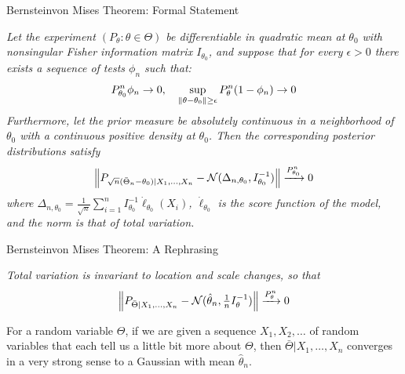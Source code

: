 \documentclass[aspectratio=169,19pt,xetex,handout]{beamer}
\begin{document}
\begin{frame}{Bernstein{\textendash}von Mises Theorem: Formal Statement}

\emph{Let the experiment $(P_\theta:\theta\in\Theta)$ be differentiable in quadratic mean at $\theta_0$ with nonsingular Fisher information matrix $I_{\theta_0}$, and suppose that for every $\epsilon>0$ there exists a sequence of tests $\phi_n$ such that:}
\[
P_{\theta_0}^n\phi_n \to 0, \quad
\sup_{\left\lVert\theta-\theta_0\right\rVert\ge\epsilon} P_\theta^n(1-\phi_n) \to 0
\]
\emph{Furthermore, let the prior measure be absolutely continuous in a neighborhood of $\theta_0$ with a continuous positive density at $\theta_0$.  Then the corresponding posterior distributions satisfy}
\[
\left\lVert P_{\sqrt{n}(\bar\Theta_n-\theta_0)|X_1,\dotsc,X_n} - \mathcal{N}(\Delta_{n,\theta_0},I_{\theta_0}^{-1})\right\rVert\xrightarrow{P_{\theta_0}^n} 0
\]
\emph{where $\Delta_{n,\theta_0}=\tfrac{1}{\sqrt{n}}\textstyle \sum_{i=1}^n I_{\theta_0}^{-1} \dot{\ell}_{\theta_0}(X_i)$, $\dot{\ell}_{\theta_0}$ is the score function of the model, and the norm is that of total variation.}

\end{frame}

\begin{frame}{Bernstein{\textendash}von Mises Theorem: A Rephrasing}

\emph{Total variation is invariant to location and scale changes, so that}
\[
\left\lVert P_{\bar\Theta | X_1,\dotsc,X_n} - \mathcal{N}(\hat\theta_n, \tfrac{1}{n} I_\theta^{-1})\right\rVert\xrightarrow{P_\theta^n} 0
\]

For a random variable $\Theta$, if we are given a sequence $X_1,X_2,\dotsc$ of random variables that each tell us a little bit more about $\Theta$, then $\bar\Theta | X_1,\dotsc,X_n$ converges in a very strong sense to a Gaussian with mean $\hat\theta_n$.
\end{frame}
\end{document}
